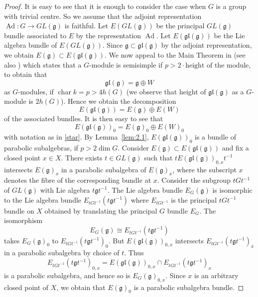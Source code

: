 \documentclass[12pt]{article}
\begin{document}
\begin{proof}
It is easy to see that it is enough to consider the case when $G$ is a group with trivial centre. So we assume that the adjoint representation $\operatorname{Ad}: G \to GL(\mathfrak{g})$ is faithful. Let $E(GL(\mathfrak{g}))$ be the principal $GL(\mathfrak{g})$ bundle associated to $E$ by the representation $\operatorname{Ad}$. Let $E(\mathfrak{gl}(\mathfrak{g}))$ be the Lie algebra bundle of $E(GL(\mathfrak{g}))$. Since $\mathfrak{g} \subset \mathfrak{gl}(\mathfrak{g})$ by the adjoint representation, we obtain $E(\mathfrak{g}) \subset E(\mathfrak{gl}(\mathfrak{g}))$. We now appeal to the Main Theorem in \cite{serre} (see also \cite{imp}) which states that a $G$-module is semisimple if $p > 2 \cdot \text{height of the module}$, to obtain that
\[
\mathfrak{gl}(\mathfrak{g}) = \mathfrak{g} \oplus W
\]
as $G$-modules, if $\operatorname{char} k = p > 4h(G)$ (we observe that height of $\mathfrak{gl}(\mathfrak{g})$ as a $G$-module is $2h(G)$). Hence we obtain the decomposition
\[
E(\mathfrak{gl}(\mathfrak{g})) = E(\mathfrak{g}) \oplus E(W)
\]
of the associated bundles. It is then easy to see that
\[
E(\mathfrak{gl}(\mathfrak{g}))_0 = E(\mathfrak{g})_0 \oplus E(W)_0
\]
with notation as in \eqref{star}. By Lemma~\ref{lem:2.1}, $E(\mathfrak{gl}(\mathfrak{g}))_0$ is a bundle of parabolic subalgebras, if $p > 2 \dim G$. Consider $E(\mathfrak{g}) \subset E(\mathfrak{gl}(\mathfrak{g}))$ and fix a closed point $x \in X$. There exists $t \in GL(\mathfrak{g})$ such that $t E(\mathfrak{gl}(\mathfrak{g}))_{0,x} t^{-1}$ intersects $E(\mathfrak{g})_x$ in a parabolic subalgebra of $E(\mathfrak{g})_x$, where the subscript $x$ denotes the fibre of the corresponding bundle at $x$. Consider the subgroup $tGt^{-1}$ of $GL(\mathfrak{g})$ with Lie algebra $t\mathfrak{g}t^{-1}$. The Lie algebra bundle $E_G(\mathfrak{g})$ is isomorphic to the Lie algebra bundle $E_{tGt^{-1}}(t\mathfrak{g}t^{-1})$ where $E_{tGt^{-1}}$ is the principal $tGt^{-1}$ bundle on $X$ obtained by translating the principal $G$ bundle $E_G$. The isomorphism
\[
E_G(\mathfrak{g}) \cong E_{tGt^{-1}}(t\mathfrak{g}t^{-1})
\]
takes $E_G(\mathfrak{g})_0$ to $E_{tGt^{-1}}(t\mathfrak{g}t^{-1})_0$. But $E(\mathfrak{gl}(\mathfrak{g}))_{0,x}$ intersects $E_{tGt^{-1}}(t\mathfrak{g}t^{-1})_x$ in a parabolic subalgebra by choice of $t$. Thus
\[
E_{tGt^{-1}}(t\mathfrak{g}t^{-1})_{0,x} = E(\mathfrak{gl}(\mathfrak{g}))_{0,x} \cap E_{tGt^{-1}}(t\mathfrak{g}t^{-1})_x
\]
is a parabolic subalgebra, and hence so is $E_G(\mathfrak{g})_{0,x}$. Since $x$ is an arbitrary closed point of $X$, we obtain that $E(\mathfrak{g})_0$ is a parabolic subalgebra bundle.
\end{proof}
\end{document}
